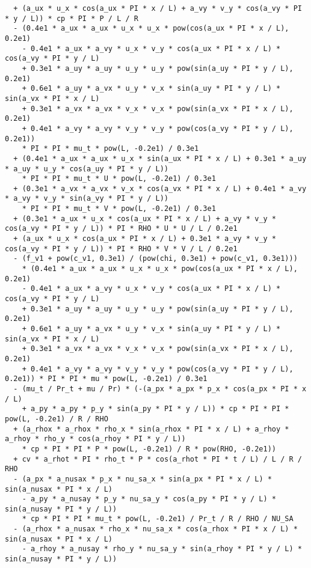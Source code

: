 \documentclass[10pt]{article}
\begin{document}
\begin{footnotesize}
\begin{verbatim}
  + (a_ux * u_x * cos(a_ux * PI * x / L) + a_vy * v_y * cos(a_vy * PI * y / L)) * cp * PI * P / L / R
  - (0.4e1 * a_ux * a_ux * u_x * u_x * pow(cos(a_ux * PI * x / L), 0.2e1)
    - 0.4e1 * a_ux * a_vy * u_x * v_y * cos(a_ux * PI * x / L) * cos(a_vy * PI * y / L)
    + 0.3e1 * a_uy * a_uy * u_y * u_y * pow(sin(a_uy * PI * y / L), 0.2e1)
    + 0.6e1 * a_uy * a_vx * u_y * v_x * sin(a_uy * PI * y / L) * sin(a_vx * PI * x / L)
    + 0.3e1 * a_vx * a_vx * v_x * v_x * pow(sin(a_vx * PI * x / L), 0.2e1)
    + 0.4e1 * a_vy * a_vy * v_y * v_y * pow(cos(a_vy * PI * y / L), 0.2e1))
    * PI * PI * mu_t * pow(L, -0.2e1) / 0.3e1
  + (0.4e1 * a_ux * a_ux * u_x * sin(a_ux * PI * x / L) + 0.3e1 * a_uy * a_uy * u_y * cos(a_uy * PI * y / L))
    * PI * PI * mu_t * U * pow(L, -0.2e1) / 0.3e1
  + (0.3e1 * a_vx * a_vx * v_x * cos(a_vx * PI * x / L) + 0.4e1 * a_vy * a_vy * v_y * sin(a_vy * PI * y / L))
    * PI * PI * mu_t * V * pow(L, -0.2e1) / 0.3e1
  + (0.3e1 * a_ux * u_x * cos(a_ux * PI * x / L) + a_vy * v_y * cos(a_vy * PI * y / L)) * PI * RHO * U * U / L / 0.2e1
  + (a_ux * u_x * cos(a_ux * PI * x / L) + 0.3e1 * a_vy * v_y * cos(a_vy * PI * y / L)) * PI * RHO * V * V / L / 0.2e1
  - (f_v1 + pow(c_v1, 0.3e1) / (pow(chi, 0.3e1) + pow(c_v1, 0.3e1)))
    * (0.4e1 * a_ux * a_ux * u_x * u_x * pow(cos(a_ux * PI * x / L), 0.2e1)
    - 0.4e1 * a_ux * a_vy * u_x * v_y * cos(a_ux * PI * x / L) * cos(a_vy * PI * y / L)
    + 0.3e1 * a_uy * a_uy * u_y * u_y * pow(sin(a_uy * PI * y / L), 0.2e1)
    + 0.6e1 * a_uy * a_vx * u_y * v_x * sin(a_uy * PI * y / L) * sin(a_vx * PI * x / L)
    + 0.3e1 * a_vx * a_vx * v_x * v_x * pow(sin(a_vx * PI * x / L), 0.2e1)
    + 0.4e1 * a_vy * a_vy * v_y * v_y * pow(cos(a_vy * PI * y / L), 0.2e1)) * PI * PI * mu * pow(L, -0.2e1) / 0.3e1
  - (mu_t / Pr_t + mu / Pr) * (-(a_px * a_px * p_x * cos(a_px * PI * x / L)
    + a_py * a_py * p_y * sin(a_py * PI * y / L)) * cp * PI * PI * pow(L, -0.2e1) / R / RHO
  + (a_rhox * a_rhox * rho_x * sin(a_rhox * PI * x / L) + a_rhoy * a_rhoy * rho_y * cos(a_rhoy * PI * y / L))
    * cp * PI * PI * P * pow(L, -0.2e1) / R * pow(RHO, -0.2e1))
  + cv * a_rhot * PI * rho_t * P * cos(a_rhot * PI * t / L) / L / R / RHO
  - (a_px * a_nusax * p_x * nu_sa_x * sin(a_px * PI * x / L) * sin(a_nusax * PI * x / L)
    - a_py * a_nusay * p_y * nu_sa_y * cos(a_py * PI * y / L) * sin(a_nusay * PI * y / L))
    * cp * PI * PI * mu_t * pow(L, -0.2e1) / Pr_t / R / RHO / NU_SA
  - (a_rhox * a_nusax * rho_x * nu_sa_x * cos(a_rhox * PI * x / L) * sin(a_nusax * PI * x / L)
    - a_rhoy * a_nusay * rho_y * nu_sa_y * sin(a_rhoy * PI * y / L) * sin(a_nusay * PI * y / L))

\end{verbatim}
\end{footnotesize}
\end{document}
